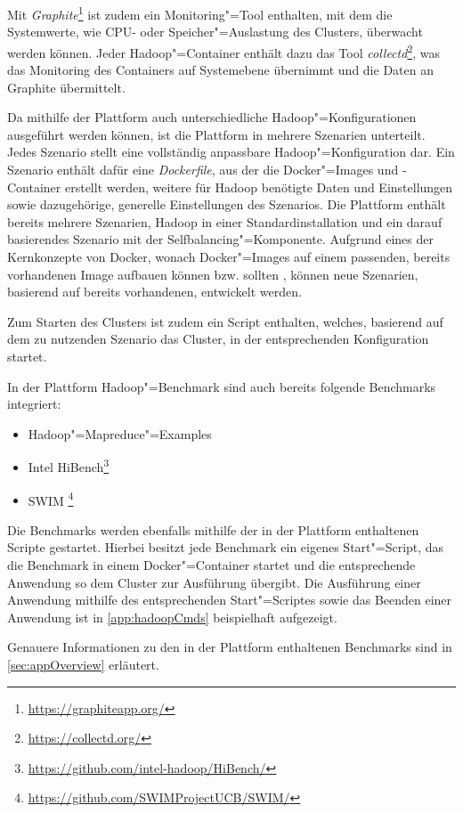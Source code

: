 Mit \emph{Graphite}\footnote{\url{https://graphiteapp.org/}} ist zudem ein Monitoring"=Tool enthalten, mit dem die Systemwerte, wie CPU- oder Speicher"=Auslastung des Clusters, überwacht werden können.
Jeder Hadoop"=Container enthält dazu das Tool \emph{collectd}\footnote{\url{https://collectd.org/}}, was das Monitoring des Containers auf Systemebene übernimmt und die Daten an Graphite übermittelt.

Da mithilfe der Plattform auch unterschiedliche Hadoop"=Konfigurationen ausgeführt werden können, ist die Plattform in mehrere Szenarien unterteilt.
Jedes Szenario stellt eine vollständig anpassbare Hadoop"=Konfiguration dar.
Ein Szenario enthält dafür eine \emph{Dockerfile}, aus der die Docker"=Images und -Container erstellt werden, weitere für Hadoop benötigte Daten und Einstellungen sowie dazugehörige, generelle Einstellungen des Szenarios.
Die Plattform enthält bereits mehrere Szenarien, \uA Hadoop in einer Standardinstallation und ein darauf basierendes Szenario mit der Selfbalancing"=Komponente.
Aufgrund eines der Kernkonzepte von Docker, wonach Docker"=Images auf einem passenden, bereits vorhandenen Image aufbauen können bzw. sollten \cite{DockerdevBestPractice}, können neue Szenarien, basierend auf bereits vorhandenen, entwickelt werden.

Zum Starten des Clusters ist zudem ein Script enthalten, welches, basierend auf dem zu nutzenden Szenario das Cluster, in der entsprechenden Konfiguration startet.

In der Plattform Hadoop"=Benchmark sind auch bereits folgende Benchmarks integriert:

\begin{itemize}
    \item Hadoop"=Mapreduce"=Examples
    \item Intel HiBench\footnote{\url{https://github.com/intel-hadoop/HiBench/}}
    \item \gls{SWIM} \footnote{\url{https://github.com/SWIMProjectUCB/SWIM/}}
\end{itemize}

Die Benchmarks werden ebenfalls mithilfe der in der Plattform enthaltenen Scripte gestartet.
Hierbei besitzt jede Benchmark ein eigenes Start"=Script, das die Benchmark in einem Docker"=Container startet und die entsprechende Anwendung so dem Cluster zur Ausführung übergibt.
Die Ausführung einer Anwendung mithilfe des entsprechenden Start"=Scriptes sowie das Beenden einer Anwendung ist in \cref{app:hadoopCmds} beispielhaft aufgezeigt.

Genauere Informationen zu den in der Plattform enthaltenen Benchmarks sind in \cref{sec:appOverview} erläutert.
